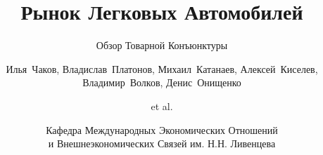\title[Экономическая Конъюнктура] %
{Рынок Легковых Автомобилей}

\subtitle{Обзор Товарной Конъюнктуры}

\author[4-МЭО-5] %
    {Илья~Чаков, 
    Владислав~Платонов,
    Михаил~Катанаев,
    Алексей~Киселев,
    Владимир~Волков,
    Денис~Онищенко \and et al.
    }


\date[Ноябрь 2024] %
{Кафедра Международных Экономических Отношений \\
и Внешнеэкономических Связей им. Н.Н. Ливенцева}